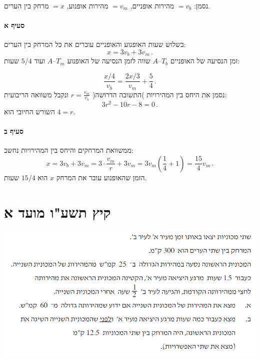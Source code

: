 \documentclass[12pt,a4paper]{article}
\begin{document}
נסמן:
$=v_b$
מהירות אופניים,
$=v_m$
מהירות אופנוע,
$=x$
מרחק בין הערים.
\paragraph{סעיף א}

בשלוש שעות האופנוע והאופניים עוברים את כל המרחק בין הערים:
\[
x = 3v_b + 3 v_m\,.
\]
זמן הנסיעה של האופניים
$T_b$--$A$
שווה לזמן הנסיעה של האופנוע
$T_m$--$A$
ועוד
$5/4$
שעות:

\[
\frac{x/4}{v_b} = \frac{2x/3}{v_m} + \frac{5}{4}\,.
\]
נסמן את היחס בין המהירויות )התשובה הדרושה(
$r=\frac{v_m}{v_b}$
ונקבל משוואה הריבועית:
\[
3r^2 - 10r - 8 = 0\,.
\]
השורש החיובי הוא
$4=r$.

\newpage

\paragraph{סעיף ב}
ממשוואת המרחקים והיחס בין המהירויות נחשב:
\[
x = 3v_b + 3v_m = 3\cdot\frac{v_m}{r}+3v_m = 3v_m\left(\frac{1}{4}+1\right) =\frac{15}{4}v_m\,.
\]
הזמן שהאופנוע עובר את המרחק
$x$
הוא
$15/4$
שעות.

\newpage


\section*{קיץ תשע"ו מועד א}

\begin{center}
\includegraphics[width=.8\textwidth]{summer-2016a-1}
\end{center}
\end{document}
